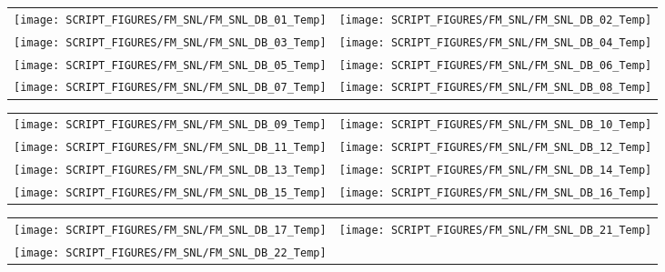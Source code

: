 \begin{figure}[!ht]
\begin{tabular*}{\textwidth}{l@{\extracolsep{\fill}}r}
\texttt{[image: SCRIPT\_FIGURES/FM\_SNL/FM\_SNL\_DB\_01\_Temp]} &
\texttt{[image: SCRIPT\_FIGURES/FM\_SNL/FM\_SNL\_DB\_02\_Temp]} \\
\texttt{[image: SCRIPT\_FIGURES/FM\_SNL/FM\_SNL\_DB\_03\_Temp]} &
\texttt{[image: SCRIPT\_FIGURES/FM\_SNL/FM\_SNL\_DB\_04\_Temp]} \\
\texttt{[image: SCRIPT\_FIGURES/FM\_SNL/FM\_SNL\_DB\_05\_Temp]} &
\texttt{[image: SCRIPT\_FIGURES/FM\_SNL/FM\_SNL\_DB\_06\_Temp]} \\
\texttt{[image: SCRIPT\_FIGURES/FM\_SNL/FM\_SNL\_DB\_07\_Temp]} &
\texttt{[image: SCRIPT\_FIGURES/FM\_SNL/FM\_SNL\_DB\_08\_Temp]}
\end{tabular*}
\end{figure}

\begin{figure}[!ht]
\begin{tabular*}{\textwidth}{l@{\extracolsep{\fill}}r}
\texttt{[image: SCRIPT\_FIGURES/FM\_SNL/FM\_SNL\_DB\_09\_Temp]} &
\texttt{[image: SCRIPT\_FIGURES/FM\_SNL/FM\_SNL\_DB\_10\_Temp]} \\
\texttt{[image: SCRIPT\_FIGURES/FM\_SNL/FM\_SNL\_DB\_11\_Temp]} &
\texttt{[image: SCRIPT\_FIGURES/FM\_SNL/FM\_SNL\_DB\_12\_Temp]} \\
\texttt{[image: SCRIPT\_FIGURES/FM\_SNL/FM\_SNL\_DB\_13\_Temp]} &
\texttt{[image: SCRIPT\_FIGURES/FM\_SNL/FM\_SNL\_DB\_14\_Temp]} \\
\texttt{[image: SCRIPT\_FIGURES/FM\_SNL/FM\_SNL\_DB\_15\_Temp]} &
\texttt{[image: SCRIPT\_FIGURES/FM\_SNL/FM\_SNL\_DB\_16\_Temp]}
\end{tabular*}
\end{figure}

\begin{figure}[!ht]
\begin{tabular*}{\textwidth}{l@{\extracolsep{\fill}}r}
\texttt{[image: SCRIPT\_FIGURES/FM\_SNL/FM\_SNL\_DB\_17\_Temp]} &
\texttt{[image: SCRIPT\_FIGURES/FM\_SNL/FM\_SNL\_DB\_21\_Temp]} \\
\texttt{[image: SCRIPT\_FIGURES/FM\_SNL/FM\_SNL\_DB\_22\_Temp]}
\end{tabular*}
\end{figure}

